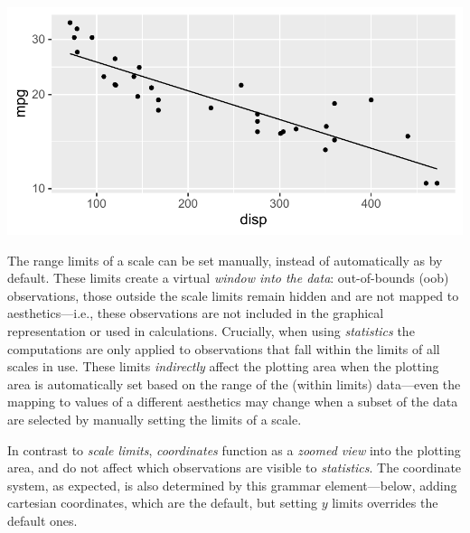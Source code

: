 \documentclass[krantz2]{krantz}\usepackage{knitr}
\begin{document}
\begin{knitrout}\footnotesize
{}\color{fgcolor}\begin{kframe}
\begin{alltt}
\hlstd{(} 
        \hlstd{=} \hlstd{(}    \hlopt{+}
  \hlstd{()} \hlopt{+}
  \hlstd{(} \hlstd{=} \hlstd{,}  \hlstd{=} \hlstd{,}   \hlopt{~}  \hlopt{+}
  \hlstd{()}
\end{alltt}
\end{kframe}

{\centering \includegraphics[width=.7\textwidth]{figure/pos-ggplot-basics-06-1} 

}


\end{knitrout}

The range limits of a scale can be set manually, instead of automatically as by default. These limits create a virtual \emph{window into the data}: out-of-bounds (oob) observations, those outside the scale limits remain hidden and are not mapped to aesthetics---i.e., these observations are not included in the graphical representation or used in calculations. Crucially, when using \emph{statistics} the computations are only applied to observations that fall within the limits of all scales in use. These limits \emph{indirectly} affect the plotting area when the plotting area is automatically set based on the range of the (within limits) data---even the mapping to values of a different aesthetics may change when a subset of the data are selected by manually setting the limits of a scale.

In contrast to \emph{scale limits}, \emph{coordinates} function as a \emph{zoomed view} into the plotting area, and do not affect which observations are visible to \emph{statistics}. The coordinate system, as expected, is also determined by this grammar element---below, adding cartesian coordinates, which are the default, but setting $y$ limits overrides the default ones. %
\end{document}
